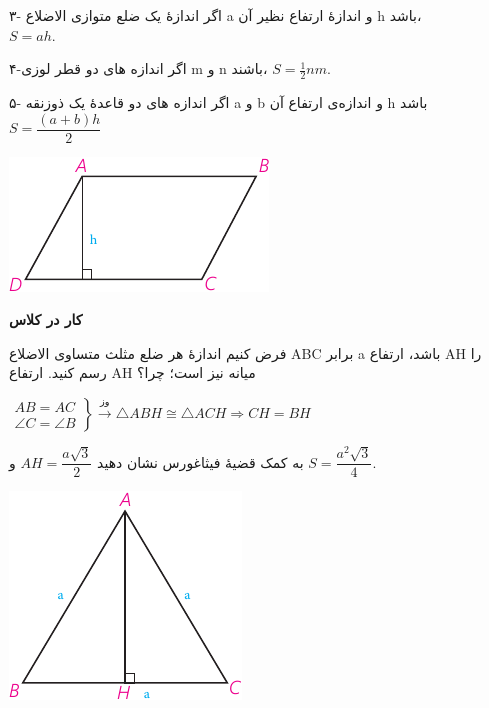 \documentclass[12pt, a4paper]{book}
\begin{document}
\begin{minipage}{0.65\textwidth}
۳- اگر اندازهٔ یک ضلع متوازی الاضلاع a و اندازهٔ ارتفاع نظیر آن h باشد، \\ $S=ah$.

۴-اگر اندازه های دو قطر لوزی m و n باشند، $S=\frac12 nm$.
	
۵- اگر اندازه های دو قاعدهٔ یک ذوزنقه a و b و اندازه‌ی ارتفاع آن h باشد\\
	 $S = \dfrac{(a+b)h}2$
\end{minipage}
\begin{minipage}{0.3\textwidth}
	\begin{flushleft}
		\includegraphics{"Shapes/Fasl - 3/Dars 2/P65-S2"}
	\end{flushleft}
\end{minipage}

\bigskip

\textbf{کار در کلاس}

\begin{minipage}{0.7\textwidth}
	فرض کنیم اندازهٔ هر ضلع مثلث متساوی الاضلاع ABC برابر a باشد، ارتفاع AH را رسم کنید. ارتفاع AH میانه نیز است؛ چرا؟
	\begin{flushleft}
		$
	\left.
	\begin{array}{ccc}
		AB = AC \\
		\angle C = \angle B
	\end{array}
	\right\}
	\xrightarrow{\mbox{وز}} \triangle ABH \cong \triangle ACH \Rightarrow CH = BH
	$
	\end{flushleft}
	به کمک قضیهٔ فیثاغورس نشان دهید 
	$AH = \dfrac{a\sqrt{3}}2$
	و 
	$S = \dfrac{a^2 \sqrt{3}}{4}$.
\end{minipage}
\begin{minipage}{0.25\textwidth}
	\begin{flushleft}
		\includegraphics{"Shapes/Fasl - 3/Dars 2/P65-S3"}
	\end{flushleft}
\end{minipage}
\end{document}
